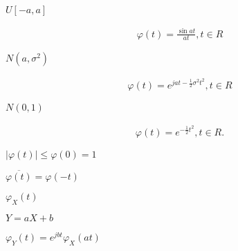 \begin{preview}
\setcounter{equation}{0}%
\(U[-a, a]\)
\end{preview}

\begin{preview}
\setcounter{equation}{0}%
\begin{align}
  \varphi(t) = \frac{\sin{at}}{at}, t \in R
\end{align}

\end{preview}

\begin{preview}
\setcounter{equation}{0}%
\(N(a, \sigma^2)\)
\end{preview}

\begin{preview}
\setcounter{equation}{0}%
\begin{align}
  \varphi(t) = e^{jat - \frac{1}{2}\sigma^2 t^2}, t\in R
\end{align}

\end{preview}

\begin{preview}
\setcounter{equation}{0}%
\(N(0, 1)\)
\end{preview}

\begin{preview}
\setcounter{equation}{0}%
\begin{align}
  \varphi(t) = e^{-\frac{1}{2}t^2}, t \in R.
\end{align}

\end{preview}

\begin{preview}
\setcounter{equation}{0}%
\(|\varphi(t)| \leq \varphi(0) = 1\)
\end{preview}

\begin{preview}
\setcounter{equation}{0}%
\(\overline{\varphi(t)} = \varphi (-t)\)
\end{preview}

\begin{preview}
\setcounter{equation}{0}%
\(\varphi_X(t)\)
\end{preview}

\begin{preview}
\setcounter{equation}{0}%
\(Y = a X + b\)
\end{preview}

\begin{preview}
\setcounter{equation}{0}%
\(  \varphi_Y(t) = e^{jbt} \varphi_X(at)\)
\end{preview}

